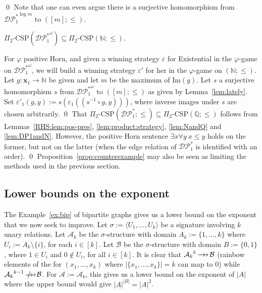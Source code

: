 \documentclass{LMCS}
\newcommand{\tuple}[1]{\ensuremath{\mathbf{#1}}}
\newcommand{\surhom}{
  \ensuremath{
      \negthinspace 
      \longrightarrow
      \hspace{-5mm} \rightarrow \hspace{1mm}
  }
}
\newcommand{\nosurhom}{
  \ensuremath{
      \negthinspace 
      \longrightarrow
      \hspace{-5mm} \rightarrow \hspace{-4mm} / \hspace{3mm}
  }
}
\begin{document}
\qed
\noindent Note that one can even argue there is a surjective homomorphism from ${\mathcal{DP}^*_1}^{\log m}$ to $([m];\leq)$.
\begin{lem}
\label{lem:DP1andN}
$\Pi_2\mbox{-}\mathrm{CSP}({\mathcal{DP}^*_1}^\omega)  \subseteq \Pi_2\mbox{-}\mathrm{CSP}(\mathbb{N};\leq)$.
\end{lem}
\proof
For $\varphi$ positive Horn, and given a winning strategy $\varepsilon$ for Existential in the $\varphi$-game on ${\mathcal{DP}^*_1}^\omega$, we will build a winning strategy $\varepsilon'$ for her in the $\varphi$-game on $(\mathbb{N};\leq)$. Let $g:\tuple{x}_1\rightarrow \mathbb{N}$ be given and let $m$ be the maximum of $\mathrm{Im}(g)$. Let $s$ a surjective homomorphism $s$ from ${\mathcal{DP}^*_1}^\omega$ to $([m];\leq)$ as given by Lemma~\ref{lem:lately}.
Set $\varepsilon'_1(g,y):=s(\varepsilon_1((s^{-1}\circ g,y)))$, where inverse images under $s$ are chosen arbitrarily.
\qed
{}
That $\Pi_2\mbox{-}\mathrm{CSP}(\mathcal{DP}^*_1;\leq)  \subseteq \Pi_2\mbox{-}\mathrm{CSP}(\mathbb{Q};\leq)$ follows from Lemmas~\ref{RHS:lem:pos-pres}, \ref{lem:product:strategy}, \ref{lem:NandQ} and \ref{lem:DP1andN}. However, the positive Horn sentence $\exists x \forall y \ x\leq y$ holds on the former, but not on the latter (when the edge relation of $\mathcal{DP}^*_1$ is identified with an order).
\qed
\noindent Proposition~\ref{prop:counterexample} may also be seen as limiting the methods used in the previous section.

\subsection{Lower bounds on the exponent}
\label{sec:lowerbound}

The Example~\ref{ex:bip} of bipartite graphs gives us a lower bound on the exponent that we now seek to improve.
Let $\sigma:=\langle U_1,\ldots,U_k\rangle$ be a signature involving $k$ unary relations. Let $\mathcal{A}_k$ be the $\sigma$-structure with domain $A_k:=\{1,\ldots,k\}$ where $U_i:=A_k \setminus \{i\}$, for each $i \in [k]$. Let $\mathcal{B}$ be the $\sigma$-structure  with domain $B:=\{0,1\}$, where $1 \in U_i$ and $0 \notin U_i$, for all $i \in [k]$. It is clear that ${\mathcal{A}_k}^{k} \surhom \mathcal{B}$ (rainbow elements of the for $(x_1,\ldots,x_k)$ where $|\{x_1,\ldots,x_k\}|=k$ can map to $0$) while ${\mathcal{A}_k}^{k-1} \nosurhom \mathcal{B}$. For $\mathcal{A}:=\mathcal{A}_k$, this gives us a lower bound on the exponent of $|A|$ where the upper bound would give $|A|^{|B|}=|A|^2$.
\end{document}
